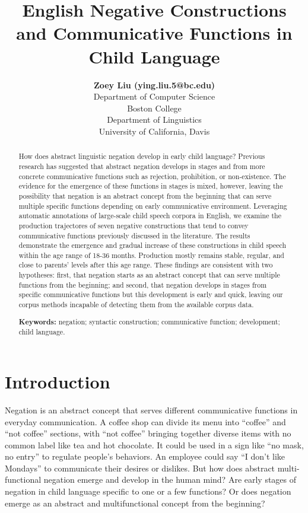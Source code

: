 \documentclass[10pt, letterpaper]{article}
\title{English Negative Constructions and Communicative Functions in Child
Language}
\author{{\large \bf Zoey Liu (ying.liu.5@bc.edu)} \\ Department of Computer Science \\ Boston College \AND {\large \bf Masoud Jasbi (jasbi@ucdavis.edu)} \\ Department of Linguistics \\ University of California, Davis}
\begin{document}
\maketitle

\begin{abstract}
How does abstract linguistic negation develop in early child language?
Previous research has suggested that abstract negation develops in
stages and from more concrete communicative functions such as rejection,
prohibition, or non-existence. The evidence for the emergence of these
functions in stages is mixed, however, leaving the possibility that
negation is an abstract concept from the beginning that can serve
multiple specific functions depending on early communicative
environment. Leveraging automatic annotations of large-scale child
speech corpora in English, we examine the production trajectores of
seven negative constructions that tend to convey communicative functions
previously discussed in the literature. The results demonstrate the
emergence and gradual increase of these constructions in child speech
within the age range of 18-36 months. Production mostly remains stable,
regular, and close to parents' levels after this age range. These
findings are consistent with two hypotheses: first, that negation starts
as an abstract concept that can serve multiple functions from the
beginning; and second, that negation develops in stages from specific
communicative functions but this development is early and quick, leaving
our corpus methods incapable of detecting them from the available corpus
data.

\textbf{Keywords:}
negation; syntactic construction; communicative function; development;
child language.
\end{abstract}

\hypertarget{introduction}{%
\section{Introduction}\label{introduction}}

Negation is an abstract concept that serves different communicative
functions in everyday communication. A coffee shop can divide its menu
into ``coffee'' and ``not coffee'' sections, with ``not coffee''
bringing together diverse items with no common label like tea and hot
chocolate. It could be used in a sign like ``no mask, no entry'' to
regulate people's behaviors. An employee could say ``I don't like
Mondays'' to communicate their desires or dislikes. But how does
abstract multi-functional negation emerge and develop in the human mind?
Are early stages of negation in child language specific to one or a few
functions? Or does negation emerge as an abstract and multifunctional
concept from the beginning?
\end{document}
